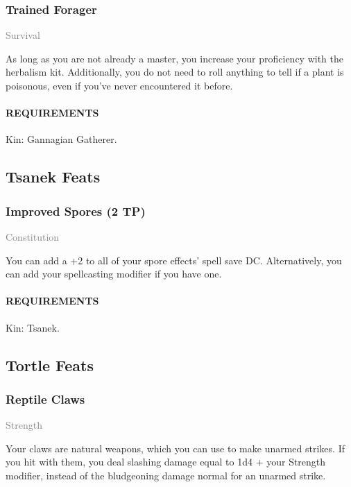     \subsubsection{Trained Forager} \label{feat::trainedforager}
    \small{\textcolor{gray}{Survival}}

    \normalsize
    As long as you are not already a master, you increase your proficiency with the herbalism kit.
    Additionally, you do not need to roll anything to tell if a plant is poisonous, even if you've never encountered it before.
    \paragraph{REQUIREMENTS} Kin: Gannagian Gatherer.

\subsection*{Tsanek Feats}
    \subsubsection{Improved Spores (2 TP)} \label{feat::improvedspores}
    \small{\textcolor{gray}{Constitution}}

    \normalsize
    You can add a +2 to all of your spore effects' spell save DC.
    Alternatively, you can add your spellcasting modifier if you have one.
    \paragraph{REQUIREMENTS} Kin: Tsanek.

\subsection*{Tortle Feats}
    \subsubsection{Reptile Claws} \label{feat::reptileclaws}
    \small{\textcolor{gray}{Strength}}

    \normalsize
    Your claws are natural weapons, which you can use to make unarmed strikes.
    If you hit with them, you deal slashing damage equal to 1d4 + your Strength modifier, instead of the bludgeoning damage normal for an unarmed strike.
